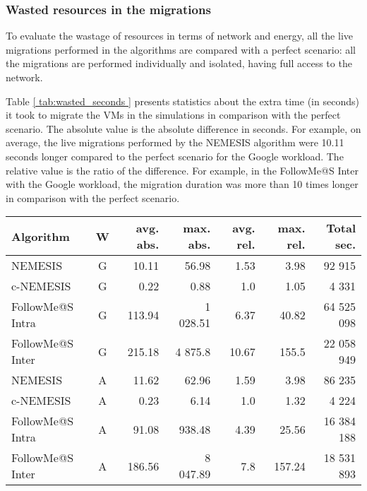 \subsubsection{Wasted resources in the migrations}
\label{sec:wasted_resources_smartgreens}
To evaluate the wastage of resources in terms of network and energy, all the live migrations performed in the algorithms are compared with a perfect scenario: all the migrations are performed individually and isolated, having full access to the network.

Table \ref{ tab:wasted_seconds } presents statistics about the extra time (in seconds) it took to migrate the VMs in the simulations in comparison with the perfect scenario. The absolute value is the absolute difference in seconds. For example, on average, the live migrations performed by the NEMESIS algorithm were 10.11 seconds longer compared to the perfect scenario for the Google workload. The relative value is the ratio of the difference. For example, in the FollowMe@S Inter with the Google workload, the migration duration was more than 10 times longer in comparison with the perfect scenario.


\begin{table*}[!ht]
  \small

\caption{Extra seconds during migrations compared to the case when there is no congestion, where ``W'' stands for ``Workload'', ``G'' for Google and, ``A'' for Azure. ``avg.'' for the average of the observations, ``max.'' for the maximum value, ``abs.'' for the absolute value, and ``rel.'' for the relative value.} \label{ tab:wasted_seconds } \centering
\begin{tabular}{|l|c|r|r|r|r|r|}
  \hline  
  \textbf{Algorithm} & \textbf{W}  & \textbf{avg. abs.} &  \textbf{max. abs.} & \textbf{avg. rel.} &  \textbf{max. rel.} &  \textbf{Total sec.} \\
  
  \hline
  NEMESIS  & G & 10.11  & 56.98 & 1.53 & 3.98  & 92 915\\
  \hline
  c-NEMESIS & G & 0.22  & 0.88 & 1.0 & 1.05  & 4 331 \\
  \hline
  FollowMe@S Intra & G & 113.94  & 1 028.51 &  6.37  & 40.82  & 64 525 098 \\
  \hline
  FollowMe@S Inter & G & 215.18  & 4 875.8 & 10.67 & 155.5  & 22 058 949\\
  \hline
  NEMESIS  & A & 11.62  & 62.96 & 1.59 & 3.98  & 86 235 \\
  \hline
  c-NEMESIS & A &  0.23 & 6.14   & 1.0 & 1.32  & 4 224\\
  \hline
  FollowMe@S Intra & A & 91.08  & 938.48 & 4.39 & 25.56  & 16 384 188  \\
  \hline
  FollowMe@S Inter & A & 186.56  & 8 047.89 & 7.8 & 157.24  & 18 531 893 \\
  \hline

\end{tabular}

\end{table*}


